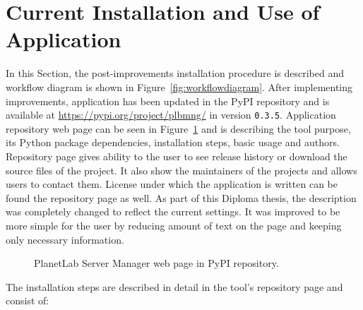 {{{{{{{\section{Current Installation and Use of Application}
\label{section:currentapp}
In this Section, the post-improvements installation procedure is described and workflow diagram is shown in Figure~\ref{fig:workflowdiagram}. After implementing improvements, application has been updated in the PyPI repository and is available at \url{https://pypi.org/project/plbmng/} in version \texttt{0.3.5}. Application repository web page can be seen in Figure~\ref{fig:plbmngrepo} and is describing the tool purpose, its Python package dependencies, installation steps, basic usage and authors. Repository page gives ability to the user to see release history or download the source files of the project. It also show the maintainers of the projects and allows users to contact them. License under which the application is written can be found the repository page as well. As part of this Diploma thesis, the description was completely changed to reflect the current settings. It was improved to be more simple for the user by reducing amount of text on the page and keeping only necessary information.

\begin{figure}[H]
	\centering
	\caption{PlanetLab Server Manager web page in PyPI repository.}
	\label{fig:plbmngrepo}
\end{figure}

The installation steps are described in detail in the tool's repository page and consist of:

}}}}}}}
